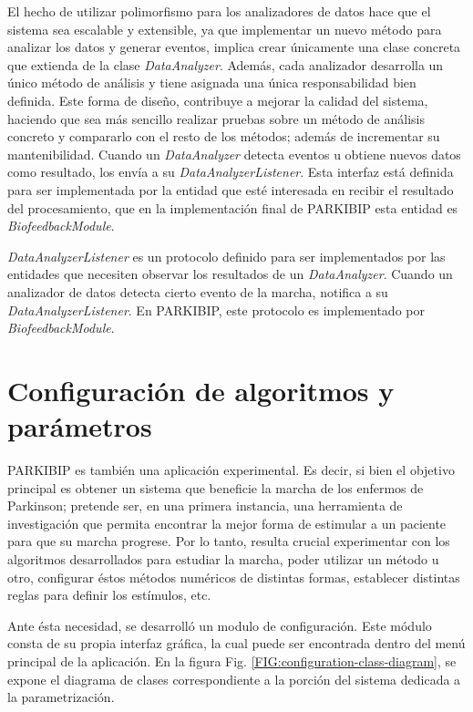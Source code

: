 El hecho de utilizar polimorfismo para los analizadores de datos hace que el sistema sea escalable y extensible, ya que implementar un nuevo método para analizar los datos y generar eventos, implica crear únicamente una clase concreta que extienda de la clase \textit{DataAnalyzer}. Además, cada analizador desarrolla un único método de análisis y tiene asignada una única responsabilidad bien definida. Este forma de diseño, contribuye a mejorar la calidad del sistema, haciendo que sea más sencillo realizar pruebas sobre un método de análisis concreto y compararlo con el resto de los métodos; además de incrementar su mantenibilidad. 
Cuando un \textit{DataAnalyzer} detecta eventos u obtiene nuevos datos como resultado, los envía a su \textit{DataAnalyzerListener}. Esta interfaz está definida para ser implementada por la entidad que esté interesada en recibir el resultado del procesamiento, que en la implementación final de PARKIBIP esta entidad es \textit{BiofeedbackModule}. 

\textit{DataAnalyzerListener} es un protocolo definido para ser implementados por las entidades que necesiten observar los resultados de un \textit{DataAnalyzer}. Cuando un analizador de datos detecta cierto evento de la marcha, notifica a su \textit{DataAnalyzerListener}. En PARKIBIP, este protocolo es implementado por \textit{BiofeedbackModule}.

\section{Configuración de algoritmos y parámetros} 

PARKIBIP es también una aplicación experimental. Es decir, si bien el objetivo principal es obtener un sistema que beneficie la marcha de los enfermos de Parkinson; pretende ser, en una primera instancia, una herramienta de investigación que permita encontrar la mejor forma de estimular a un paciente para que su marcha progrese. Por lo tanto, resulta crucial experimentar con los algoritmos desarrollados para estudiar la marcha, poder utilizar un método u otro, configurar éstos métodos numéricos de distintas formas, establecer distintas reglas para definir los estímulos, etc. 

Ante ésta necesidad, se desarrolló un modulo de configuración. Este módulo consta de su propia interfaz gráfica, la cual puede ser encontrada dentro del menú principal de la aplicación. En la figura Fig. \ref{FIG:configuration-class-diagram}, se expone el diagrama de clases correspondiente a la porción del sistema dedicada a la parametrización.

